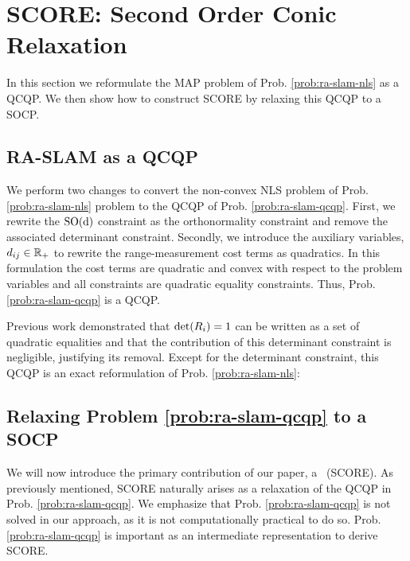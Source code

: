 \section{SCORE: Second Order Conic Relaxation}
\label{sec:ra-slam-score}
In this section we reformulate the MAP problem of Prob. \ref{prob:ra-slam-nls} as a
QCQP. We then show how to construct SCORE by relaxing this QCQP to a SOCP.

\subsection{RA-SLAM as a QCQP}
\label{sec:ra-slam-qcqp}
 We perform two changes to convert the non-convex NLS problem of
 Prob. \ref{prob:ra-slam-nls} problem to the QCQP of Prob. \ref{prob:ra-slam-qcqp}. First, we
 rewrite the $\operatorname{{\operatorname{SO}}(d)}$ constraint as the orthonormality constraint and remove the
 associated determinant constraint.  Secondly, we introduce the auxiliary
 variables, $d_{ij} \in \mathbb{R}_{+}$ to rewrite the range-measurement cost
 terms as quadratics.  In this formulation the cost terms are quadratic and
 convex with respect to the problem variables and all constraints are quadratic
 equality constraints. Thus, Prob. \ref{prob:ra-slam-qcqp} is a QCQP.

Previous work \cite{carlone15iros,briales17ral,tron15rssworkshop} demonstrated
that $\det(R_i) = 1$ can be written as a set of quadratic equalities and that
the contribution of this determinant constraint is negligible, justifying its
removal. Except for the determinant constraint, this QCQP is an exact
reformulation of Prob. \ref{prob:ra-slam-nls}:
\RaSlamQcqp

\subsection{Relaxing Problem \ref{prob:ra-slam-qcqp} to a SOCP}
\label{sec:ra-slam-socp}

We will now introduce the primary contribution of our paper, a \ScoreFull~(SCORE). As
previously mentioned, SCORE naturally arises as a relaxation of the QCQP in
Prob. \ref{prob:ra-slam-qcqp}. We emphasize that Prob. \ref{prob:ra-slam-qcqp} is not solved
in our approach, as it is not computationally practical to do so.
Prob. \ref{prob:ra-slam-qcqp} is important as an intermediate representation to derive
SCORE.

